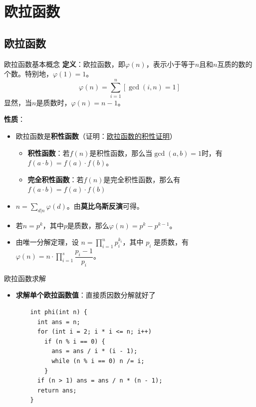 \section{欧拉函数}
\subsection{欧拉函数}
\begin{frame}[fragile]{欧拉函数}{基本概念}
  \textbf{定义}：欧拉函数，即$\varphi(n)$，表示小于等于$n$且和$n$互质的数的个数。特别地，$\varphi(1)=1$。
  $$
  \varphi(n) = \sum\limits_{i=1}^{n} [\gcd(i, n)=1]
  $$
  显然，当$n$是质数时，$\varphi(n)=n-1$。
  \vspace{0.3cm}
  \pause

  \textbf{性质}：
  \begin{itemize}
    \item 欧拉函数是\textbf{积性函数}（证明：\href{https://xdbirdie.github.io/2020/07/07/%E6%AC%A7%E6%8B%89%E5%87%BD%E6%95%B0/}{欧拉函数的积性证明}）
    \begin{itemize}
      \item \textbf{积性函数}：若$f(n)$是积性函数，那么当$\gcd(a,b)=1$时，有$f(a\cdot b)=f(a)\cdot f(b)$。
      \item \textbf{完全积性函数}：若$f(n)$是完全积性函数，那么有$f(a\cdot b)=f(a)\cdot f(b)$
    \end{itemize}
    \pause
    \item $n = \sum_{d|n}\varphi(d)$。由\textbf{莫比乌斯反演}可得。
    \pause
    \item 若$n=p^k$，其中$p$是质数，那么$\varphi(n)=p^k - p^{k-1}$。
    \item 由唯一分解定理，设 $n = \prod_{i=1}^{n}p_i^{k_i}$，其中 $p_i$ 是质数，有 $\varphi(n) = n \cdot \prod\limits_{i = 1}^s{\dfrac{p_i - 1}{p_i}}$。
  \end{itemize}
\end{frame}

\begin{frame}[fragile]{欧拉函数}{求解}
  \begin{itemize}
    \item \textbf{求解单个欧拉函数值}：直接质因数分解就好了
    \begin{lstlisting}
    int phi(int n) {
      int ans = n;
      for (int i = 2; i * i <= n; i++)
        if (n % i == 0) {
          ans = ans / i * (i - 1);
          while (n % i == 0) n /= i;
        }
      if (n > 1) ans = ans / n * (n - 1);
      return ans;
    }
    \end{lstlisting}
  \end{itemize}
\end{frame}

